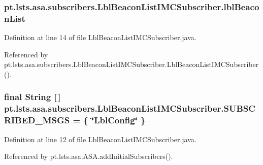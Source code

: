 \subsubsection[{lbl\+Beacon\+List}]{ pt.\+lsts.\+asa.\+subscribers.\+Lbl\+Beacon\+List\+I\+M\+C\+Subscriber.\+lbl\+Beacon\+List\hspace{0.3cm}{\ttfamily [private]}}\label{classpt_1_1lsts_1_1asa_1_1subscribers_1_1LblBeaconListIMCSubscriber_aeff98fec2248ed71734e4027cae8f22c}


Definition at line 14 of file Lbl\+Beacon\+List\+I\+M\+C\+Subscriber.\+java.



Referenced by pt.\+lsts.\+asa.\+subscribers.\+Lbl\+Beacon\+List\+I\+M\+C\+Subscriber.\+Lbl\+Beacon\+List\+I\+M\+C\+Subscriber().

\hypertarget{classpt_1_1lsts_1_1asa_1_1subscribers_1_1LblBeaconListIMCSubscriber_a7295ca3b36dc60fb9f3ecd04e2589de2}{}
\subsubsection[{S\+U\+B\+S\+C\+R\+I\+B\+E\+D\+\_\+\+M\+S\+G\+S}]{\setlength{\rightskip}{0pt plus 5cm}final String \mbox{[}$\,$\mbox{]} pt.\+lsts.\+asa.\+subscribers.\+Lbl\+Beacon\+List\+I\+M\+C\+Subscriber.\+S\+U\+B\+S\+C\+R\+I\+B\+E\+D\+\_\+\+M\+S\+G\+S = \{ \char`\"{}Lbl\+Config\char`\"{} \}\hspace{0.3cm}{\ttfamily [static]}}\label{classpt_1_1lsts_1_1asa_1_1subscribers_1_1LblBeaconListIMCSubscriber_a7295ca3b36dc60fb9f3ecd04e2589de2}


Definition at line 12 of file Lbl\+Beacon\+List\+I\+M\+C\+Subscriber.\+java.



Referenced by pt.\+lsts.\+asa.\+A\+S\+A.\+add\+Initial\+Subscribers().

\hypertarget{classpt_1_1lsts_1_1asa_1_1subscribers_1_1LblBeaconListIMCSubscriber_a32c2d10354ceba194c068d3acd295d5e}{}
